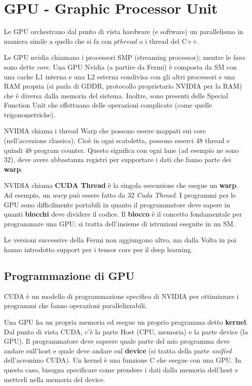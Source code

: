 \documentclass{article}
\begin{document}
\clearpage
\section{GPU - Graphic Processor Unit}
Le GPU orchestrano dal punto di vista hardware (e software) un parallelismo in maniera simile a quello che si fa con $pthread$ o i thread del C++.

Le GPU nvidia chiamano i processori SMP (streaming processor); mentre le \textit{lane} sono dette \textit{core}. Una GPU Nvidia (a partire da Fermi) è composta da SM con una cache L1 interna e una L2 esterna condivisa con gli altri processori e una RAM propria (si parla di GDDR, protocollo proprietario NVIDIA per la RAM) che è  diversa dalla memoria del sistema. Inoltre, sono presenti delle Special Function Unit che effettuano delle operazioni complicate (come quelle trigonometriche).

NVIDIA chiama i thread Warp che possono essere mappati sui core \\(nell'accezione classica). Cioè in ogni scatoletta, possono esserci 48 thread e quindi 48 program counter. Questo significa con ogni lane (ad esempio ne sono 32), deve avere abbastanza registri per supportare i dati che fanno parte dei \textbf{warp}.

NVIDIA chiama \textbf{CUDA Thread} è la singola esecuzione che esegue un \textbf{warp}. Ad esempio, un \textit{warp} può essere fatto da $32$ \textit{Cuda Thread}. I programmi per le GPU sono difficilmente portabili in quanto il programmatore deve sapere in quanti \textbf{blocchi} deve dividere il codice. Il \textbf{blocco} è il concetto fondamentale per programmare una GPU: si tratta dell'insieme di istruzioni eseguite in un SM. 

Le versioni successive della Fermi non aggiungono altro, ma dalla Volta in poi hanno introdotto support per i tensor core per il deep learning.

\subsection{Programmazione di GPU}
CUDA è un modello di programmazione specifico di NVIDIA per ottimizzare i programmi che fanno operazioni parallelizzabili.

Una GPU ha un propria memoria ed esegue un proprio programma detto \textbf{kernel}. Dal punto di vista CUDA, c'è la parte Host (CPU, memoria) e la parte device (la GPU). Il programmatore deve sapeere quale parte del mio programma deve andare sull'host e quale deve andare sul \textbf{device} (si tratta della parte \textit{unified} dell'acronimo CUDA). Un kernel è una funzione C che esegue con una GPU. In questo caso, bisogna specificare come prendere i dati dalla memoria dell'host e metterli nella memoria del device.
\end{document}
